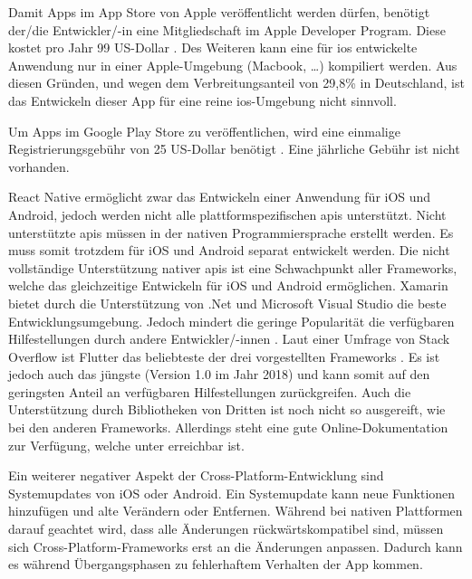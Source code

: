 Damit Apps im App Store von Apple veröffentlicht werden dürfen, benötigt der/die Entwickler/-in eine Mitgliedschaft im Apple Developer Program. Diese kostet pro Jahr 99 US-Dollar \cite{misc:appledeveloper}.
Des Weiteren kann eine für i\gls{os} entwickelte Anwendung nur in einer Apple-Umgebung (Macbook, \dots) kompiliert werden. \newline
Aus diesen Gründen, und wegen dem Verbreitungsanteil von 29,8\% in Deutschland, ist das Entwickeln dieser App für eine reine i\gls{os}-Umgebung nicht sinnvoll. \newline

Um Apps im Google Play Store zu veröffentlichen, wird eine einmalige Registrierungsgebühr von 25 US-Dollar benötigt \cite{misc:androiddeveloper}. Eine jährliche Gebühr ist 
nicht vorhanden.

React Native ermöglicht zwar das Entwickeln einer Anwendung für iOS und Android, jedoch werden nicht alle plattformspezifischen \glspl{api} unterstützt. Nicht unterstützte 
\glspl{api} müssen in der nativen Programmiersprache erstellt werden. Es muss somit trotzdem für iOS und Android separat entwickelt werden. \cite{misc:reactnative_vs_native}\newline
Die nicht vollständige Unterstützung nativer \glspl{api} ist eine Schwachpunkt aller Frameworks, welche das gleichzeitige Entwickeln für iOS und Android ermöglichen. \newline
Xamarin bietet durch die Unterstützung von .Net und Microsoft Visual Studio die beste Entwicklungsumgebung. Jedoch mindert die geringe Popularität die verfügbaren Hilfestellungen 
durch andere Entwickler/-innen \cite{misc:flutter_reactnative_xamarin}. \newline
Laut einer Umfrage von Stack Overflow ist Flutter das beliebteste der drei vorgestellten Frameworks \cite{misc:so_popularity}. Es ist jedoch auch das jüngste 
(Version 1.0 im Jahr 2018) und kann somit auf den geringsten Anteil an verfügbaren Hilfestellungen zurückgreifen. Auch die Unterstützung durch Bibliotheken von Dritten ist 
noch nicht so ausgereift, wie bei den anderen Frameworks. Allerdings steht eine gute Online-Dokumentation zur Verfügung, welche unter \cite{misc:flutter_docs} erreichbar ist.
\cite{misc:flutter_reactnative_xamarin}

Ein weiterer negativer Aspekt der Cross-Platform-Entwicklung sind Systemupdates von iOS oder Android. Ein Systemupdate kann neue Funktionen hinzufügen und alte Verändern 
oder Entfernen. Während bei nativen Plattformen darauf geachtet wird, dass alle Änderungen rückwärtskompatibel sind, müssen sich Cross-Platform-Frameworks erst an die 
Änderungen anpassen. Dadurch kann es während Übergangsphasen zu fehlerhaftem Verhalten der App kommen.

